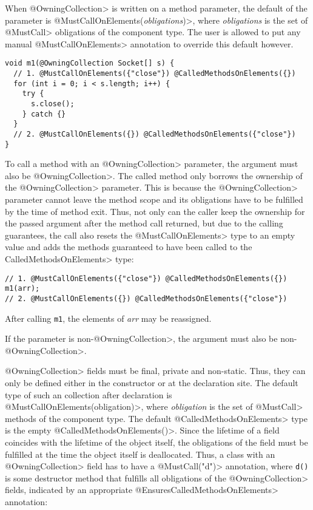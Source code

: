 When \<@OwningCollection> is written on a method parameter, the default of the parameter is \<@MustCallOnElements(\textit{obligations})>, where \textit{obligations} is the set of \<@MustCall> obligations of the component type. The user is allowed to put any manual \<@MustCallOnElements> annotation to override this default however.

\begin{verbatim}
void m1(@OwningCollection Socket[] s) {
  // 1. @MustCallOnElements({"close"}) @CalledMethodsOnElements({})
  for (int i = 0; i < s.length; i++) {
    try {
      s.close();
    } catch {}
  }
  // 2. @MustCallOnElements({}) @CalledMethodsOnElements({"close"})
}
\end{verbatim}

To call a method with an \<@OwningCollection> parameter, the argument must also be \<@OwningCollection>. The called method only borrows the ownership of the \<@OwningCollection> parameter. This is because the \<@OwningCollection> parameter cannot leave the method scope and its obligations have to be fulfilled by the time of method exit. Thus, not only can the caller keep the ownership for the passed argument after the method call returned, but due to the calling guarantees, the call also resets the \<@MustCallOnElements> type to an empty value and adds the methods guaranteed to have been called to the \<CalledMethodsOnElements> type:

\begin{verbatim}
// 1. @MustCallOnElements({"close"}) @CalledMethodsOnElements({})
m1(arr);
// 2. @MustCallOnElements({}) @CalledMethodsOnElements({"close"})
\end{verbatim}

After calling \texttt{m1}, the elements of \textit{arr} may be reassigned.

If the parameter is non-\<@OwningCollection>, the argument must also be non-\<@OwningCollection>.

\<@OwningCollection> fields must be final, private and non-static. Thus, they can only be defined either in the constructor or at the declaration site.
The default type of such an collection after declaration is \<@MustCallOnElements(obligation)>, where \textit{obligation} is the set of \<@MustCall> methods of the component type. The default \<@CalledMethodsOnElements> type is the empty \<@CalledMethodsOnElements({})>.
Since the lifetime of a field coincides with the lifetime of the object itself, the obligations of the field must be fulfilled at the time the object itself is deallocated.
Thus, a class with an \<@OwningCollection> field has to have a \<@MustCall("d")> annotation, where \texttt{d()} is some destructor method that fulfills all obligations of the \<@OwningCollection> fields, indicated by an appropriate \<@EnsuresCalledMethodsOnElements> annotation:


